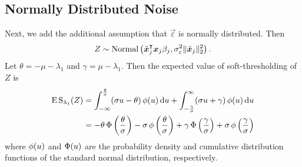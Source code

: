\subsection{Normally Distributed Noise}

Next, we add the additional assumption that \(\vec{\varepsilon}\) is normally distributed. Then
\[
  Z \sim \operatorname{Normal}\left(\tilde{\boldsymbol{x}}_j^\intercal\boldsymbol{x}_j \beta_j, \sigma_\varepsilon^2 \lVert \tilde{\boldsymbol{x}}_j\rVert_2^2 \right).
\]
Let \(\theta = -\mu -\lambda_1 \) and \(\gamma = \mu - \lambda_1\). Then the expected value of soft-thresholding of \(Z\) is
\begin{align}
  \operatorname{E} \operatorname{S}_{\lambda_1}(Z) & = \int_{-\infty}^\frac{\theta}{\sigma} (\sigma u - \theta) \operatorname{\phi}(u) \mathop{}\!\mathrm{d} u + \int_{-\frac{\gamma}{\sigma}}^\infty (\sigma u + \gamma) \operatorname{\phi}(u) \mathop{}\!\mathrm{d} u                                               \nonumber                      \\
                        & = -\theta \operatorname{\Phi}\left(\frac{\theta}{\sigma}\right) - \sigma \operatorname{\phi}\left(\frac{\theta}{\sigma}\right) + \gamma \operatorname{\Phi}\left(\frac{\gamma}{\sigma}\right) + \sigma \operatorname{\phi}\left(\frac{\gamma}{\sigma}\right) \label{eq:mean-centered-eval}
\end{align}
where \(\operatorname{\phi}(u)\) and \(\operatorname{\Phi}(u)\) are the probability density and cumulative distribution functions of the standard normal distribution, respectively.

